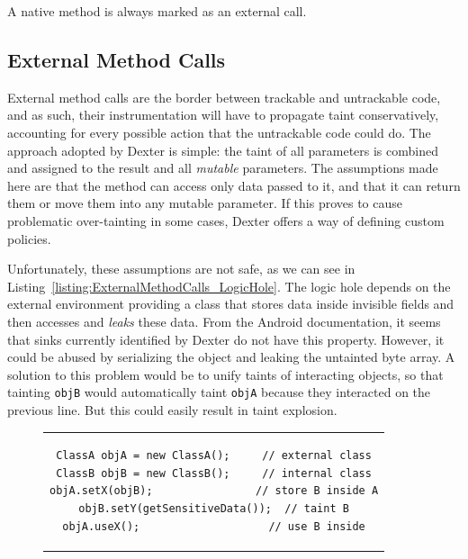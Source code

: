 \documentclass[12pt,twoside,notitlepage]{report}
\begin{document}
A native method is always marked as an external call.

\subsection{External Method Calls}
\label{section:TaintPropagation_MethodCalls_External}

External method calls are the border between trackable and untrackable code, and as such, their instrumentation will have to propagate taint conservatively, accounting for every possible action that the untrackable code could do. The approach adopted by Dexter is simple: the taint of all parameters is combined and assigned to the result and all \emph{mutable} parameters. The assumptions made here are that the method can access only data passed to it, and that it can return them or move them into any mutable parameter. If this proves to cause problematic over-tainting in some cases, Dexter offers a way of defining custom policies.

Unfortunately, these assumptions are not safe, as we can see in Listing~\ref{listing:ExternalMethodCalls_LogicHole}. The logic hole depends on the external environment providing a class that stores data inside invisible fields and then accesses and \emph{leaks} these data. From the Android documentation, it seems that sinks currently identified by Dexter do not have this property. However, it could be abused by serializing the object and leaking the untainted byte array. A solution to this problem would be to unify taints of interacting objects, so that tainting \verb$objB$ would automatically taint \verb$objA$ because they interacted on the previous line. But this could easily result in taint explosion.

\begin{figure}[H]
	\centering
	\begin{tabular}{c}
	\begin{lstlisting}
ClassA objA = new ClassA();     // external class
ClassB objB = new ClassB();     // internal class
objA.setX(objB);                // store B inside A
objB.setY(getSensitiveData());  // taint B
objA.useX();                    // use B inside
	\end{lstlisting}
	\end{tabular}
	\begin{lstlisting}[caption={Example of a propagation logic hole},
	                   label={listing:ExternalMethodCalls_LogicHole}]
	\end{lstlisting}
\end{figure}
\end{document}
